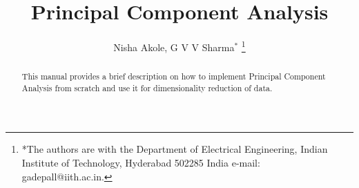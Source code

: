 \documentclass[journal,12pt,twocolumn]{IEEEtran}
\begin{document}


\let\StandardTheFigure\thefigure
\let\StandardTheTable\thetable





\def\putbox#1#2#3{\makebox[0in][l]{\makebox[#1][l]{}\raisebox{\baselineskip}[0in][0in]{\raisebox{#2}[0in][0in]{#3}}}}
     \def\rightbox#1{\makebox[0in][r]{#1}}
     \def\centbox#1{\makebox[0in]{#1}}
     \def\topbox#1{\raisebox{-\baselineskip}[0in][0in]{#1}}
     \def\midbox#1{\raisebox{-0.5\baselineskip}[0in][0in]{#1}}



\title{ 
Principal Component Analysis
}



\author{Nisha Akole, G V V 
Sharma$^{*}$%
\thanks{*The authors are with the Department
of Electrical Engineering, Indian Institute of Technology, Hyderabad
502285 India e-mail:  gadepall@iith.ac.in.}
}


\maketitle

\tableofcontents

\bigskip
%
\begin{abstract}
This manual provides a brief description on how to implement Principal Component Analysis from scratch and use it for dimensionality reduction of data.
\end{abstract}

\IEEEpeerreviewmaketitle
\end{document}
